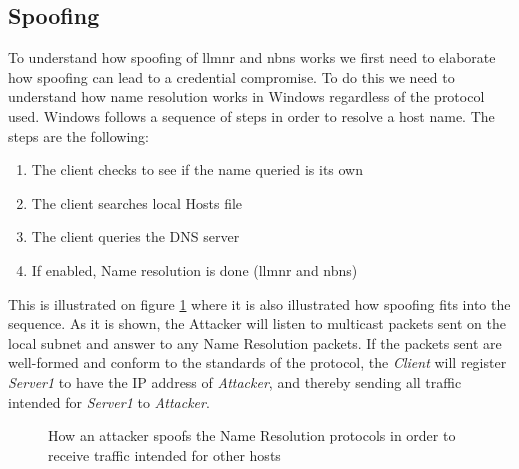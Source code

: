 \documentclass{article}
\begin{document}
\subsection{Spoofing}
\label{sec:spoofing}
To understand how spoofing of \gls{llmnr} and \gls{nbns} works we first need to elaborate how spoofing can lead to a credential compromise. To do this we need to understand how name resolution works in Windows regardless of the protocol used. Windows follows a sequence of steps in order to resolve a host name.\cite{url:microsoft:name-resolution-order} The steps are the following:
\begin{enumerate}
	\item The client checks to see if the name queried is its own
	\item The client searches local Hosts file
	\item The client queries the DNS server
	\item If enabled, Name resolution is done (\gls{llmnr} and \gls{nbns})
\end{enumerate}

This is illustrated on figure \ref{fig:host-resolution-sequence-and-spoofing} where it is also illustrated how spoofing fits into the sequence. As it is shown, the Attacker will listen to multicast packets sent on the local subnet and answer to any Name Resolution packets. If the packets sent are well-formed and conform to the standards of the protocol, the \emph{Client} will register \emph{Server1} to have the IP address of \emph{Attacker}, and thereby sending all traffic intended for \emph{Server1} to \emph{Attacker}.

\begin{figure}[H]
	\centering
	\caption{How an attacker spoofs the Name Resolution protocols in order to receive traffic intended for other hosts}
	\label{fig:host-resolution-sequence-and-spoofing}
\end{figure}
\end{document}
